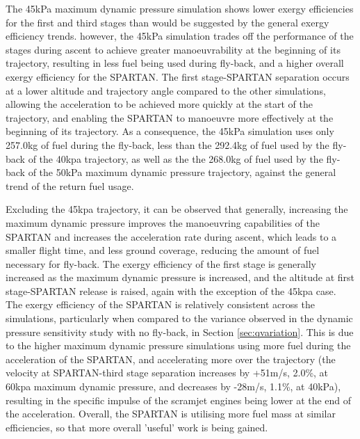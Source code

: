  The 45kPa maximum dynamic pressure simulation shows lower exergy efficiencies for the first and third stages than would be suggested by the general exergy efficiency trends. 
 however, the 45kPa simulation trades off the performance of the stages during ascent to achieve greater manoeuvrability at the beginning of its trajectory, resulting in less fuel being used during fly-back, and a higher overall exergy efficiency for the SPARTAN. The first stage-SPARTAN separation occurs at a lower altitude and trajectory angle compared to the other simulations, allowing the acceleration to be achieved more quickly at the start of the trajectory, and enabling the SPARTAN to manoeuvre more effectively at the beginning of its trajectory. 
 As a consequence, the 45kPa simulation uses only 257.0kg of fuel during the fly-back, less than the 292.4kg of fuel used by the fly-back of the 40kpa trajectory, as well as the the 268.0kg of fuel used by the fly-back of the 50kPa maximum dynamic pressure trajectory, against the general trend of the return fuel usage. 

Excluding the 45kpa trajectory, it can be observed that generally, increasing the maximum dynamic pressure improves the manoeuvring capabilities of the SPARTAN and increases the acceleration rate during ascent, which leads to a smaller flight time, and less ground coverage, reducing the amount of fuel necessary for fly-back. 
The exergy efficiency of the first stage is generally increased as the maximum dynamic pressure is increased, and the altitude at first stage-SPARTAN release is raised, again with the exception of the 45kpa case. 
The exergy efficiency of the SPARTAN is relatively consistent across the simulations, particularly when compared to the variance observed in the dynamic pressure sensitivity study with no fly-back, in Section \ref{sec:qvariation}.
This is due to the higher maximum dynamic pressure simulations using more fuel during the acceleration of the SPARTAN, and accelerating more over the trajectory (the velocity at SPARTAN-third stage separation increases by +51m/s, 2.0\%, at 60kpa maximum dynamic pressure, and decreases by -28m/s, 1.1\%, at 40kPa), resulting in the specific impulse of the scramjet engines being lower at the end of the acceleration. Overall, the SPARTAN is utilising more fuel mass at similar efficiencies, so that more overall 'useful' work is being gained. 



